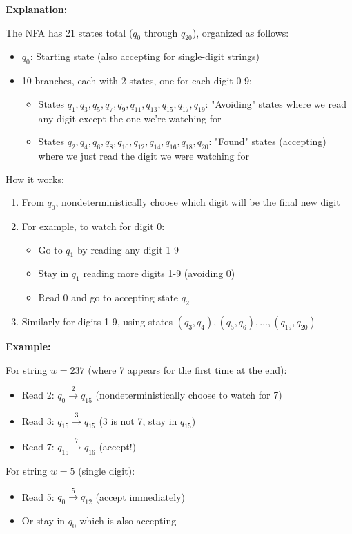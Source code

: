 \documentclass[12pt]{article}
\begin{document}
\textbf{Explanation:}

The NFA has 21 states total ($q_0$ through $q_{20}$), organized as follows:
\begin{itemize}
    \item $q_0$: Starting state (also accepting for single-digit strings)
    \item 10 branches, each with 2 states, one for each digit 0-9:
    \begin{itemize}
        \item States $q_1, q_3, q_5, q_7, q_9, q_{11}, q_{13}, q_{15}, q_{17}, q_{19}$: "Avoiding" states where we read any digit except the one we're watching for
        \item States $q_2, q_4, q_6, q_8, q_{10}, q_{12}, q_{14}, q_{16}, q_{18}, q_{20}$: "Found" states (accepting) where we just read the digit we were watching for
    \end{itemize}
\end{itemize}

How it works:
\begin{enumerate}
    \item From $q_0$, nondeterministically choose which digit will be the final new digit
    \item For example, to watch for digit 0:
    \begin{itemize}
        \item Go to $q_1$ by reading any digit 1-9
        \item Stay in $q_1$ reading more digits 1-9 (avoiding 0)
        \item Read 0 and go to accepting state $q_2$
    \end{itemize}
    \item Similarly for digits 1-9, using states $(q_3, q_4), (q_5, q_6), \ldots, (q_{19}, q_{20})$
\end{enumerate}

\textbf{Example:}

For string $w = 237$ (where 7 appears for the first time at the end):
\begin{itemize}
    \item Read 2: $q_0 \xrightarrow{2} q_{15}$ (nondeterministically choose to watch for 7)
    \item Read 3: $q_{15} \xrightarrow{3} q_{15}$ (3 is not 7, stay in $q_{15}$)
    \item Read 7: $q_{15} \xrightarrow{7} q_{16}$ (accept!)
\end{itemize}

For string $w = 5$ (single digit):
\begin{itemize}
    \item Read 5: $q_0 \xrightarrow{5} q_{12}$ (accept immediately)
    \item Or stay in $q_0$ which is also accepting
\end{itemize}
\end{document}
